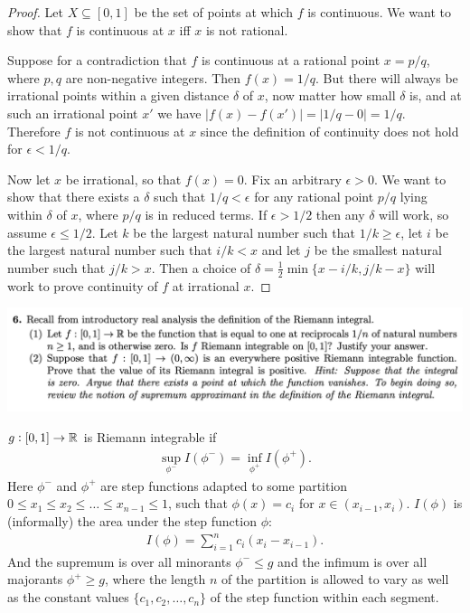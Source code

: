 \begin{proof}
  Let $X \subseteq [0, 1]$ be the set of points at which $f$ is continuous. We want to show that $f$ is
  continuous at $x$ iff $x$ is not rational.

  Suppose for a contradiction that $f$ is continuous at a rational point $x = p/q$, where $p, q$ are
  non-negative integers. Then $f(x) = 1/q$. But there will always be irrational points within a given
  distance $\delta$ of $x$, now matter how small $\delta$ is, and at such an irrational point $x'$ we
  have $|f(x) - f(x')| = |1/q - 0| = 1/q$. Therefore $f$ is not continuous at $x$ since the definition of
  continuity does not hold for $\epsilon < 1/q$.

  Now let $x$ be irrational, so that $f(x) = 0$. Fix an arbitrary $\epsilon > 0$. We want to show that there
  exists a $\delta$ such that $1/q < \epsilon$ for any rational point $p/q$ lying within $\delta$ of $x$,
  where $p/q$ is in reduced terms. If $\epsilon > 1/2$ then any $\delta$ will work, so
  assume $\epsilon \leq 1/2$. Let $k$ be the largest natural number such that $1/k \geq \epsilon$, let $i$ be
  the largest natural number such that $i/k < x$ and let $j$ be the smallest natural number such
  that $j/k > x$. Then a choice of $\delta = \frac{1}{2}\min\{x - i/k, j/k - x\}$ will work to prove continuity
  of $f$ at irrational $x$.
\end{proof}

\newpage
\begin{mdframed}
  \includegraphics[width=400pt]{img/analysis--berkeley-202a--homework-1-f5e8.png}
\end{mdframed}


\begin{definition}
  $g: [0, 1] \to \mathbb{R}$ is Riemann integrable if
  \begin{align*}
    \sup_{\phi^-} I(\phi^-) = \inf_{\phi^+} I(\phi^+).
  \end{align*}
  Here $\phi^-$ and $\phi^+$ are step functions adapted​ to some
  partition $0 \leq x_1 \leq x_2 \leq \ldots \leq x_{n-1} \leq 1$, such that $\phi(x) = c_i$
  for $x \in (x_{i-1}, x_i)$. $I(\phi)$ is (informally) the area under the step function $\phi$:
  \begin{align*}
    I(\phi) = \sum_{i=1}^n c_i(x_i - x_{i-1}).
  \end{align*}
  And the supremum is over all minorants $\phi^- \leq g$ and the infimum is over all
  majorants $\phi^+ \geq g$, where the length $n$ of the partition is allowed to vary as well as the constant
  values $\{c_1, c_2, \ldots, c_n\}$ of the step function within each segment.
\end{definition}

